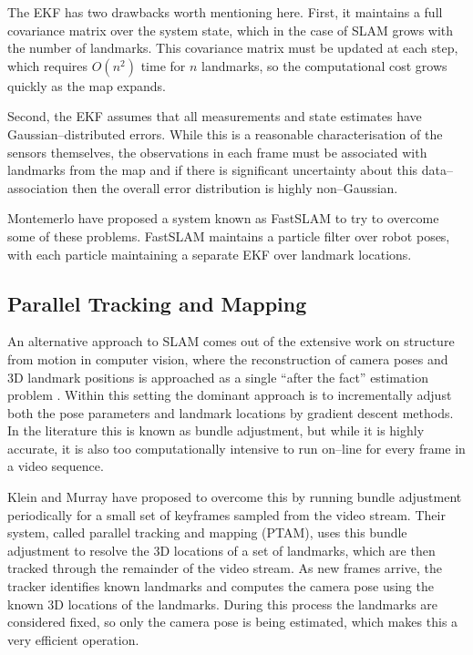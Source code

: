 The EKF has two drawbacks worth mentioning here. First, it maintains a
full covariance matrix over the system state, which in the case of
SLAM grows with the number of landmarks. This covariance matrix must
be updated at each step, which requires $O(n^2)$ time for $n$
landmarks, so the computational cost grows quickly as the map expands.

Second, the EKF assumes that all measurements and state estimates have
Gaussian--distributed errors. While this is a reasonable
characterisation of the sensors themselves, the observations in each
frame must be associated with landmarks from the map and if there is
significant uncertainty about this data--association then the overall
error distribution is highly non--Gaussian.

Montemerlo \etal \cite{Montemerlo02} have proposed a system known as
FastSLAM to try to overcome some of these problems. FastSLAM maintains
a particle filter over robot poses, with each particle maintaining a
separate EKF over landmark locations.

\subsection{Parallel Tracking and Mapping}
An alternative approach to SLAM comes out of the extensive work on
structure from motion in computer vision, where the reconstruction of
camera poses and 3D landmark positions is approached as a single
``after the fact'' estimation problem \cite{Hartley04}. Within this
setting the dominant approach is to incrementally adjust both the pose
parameters and landmark locations by gradient descent methods. In the
literature this is known as bundle adjustment, but while it is highly
accurate, it is also too computationally intensive to run on--line for
every frame in a video sequence.

Klein and Murray \cite{Klein07} have proposed to overcome this by
running bundle adjustment periodically for a small set of keyframes
sampled from the video stream. Their system, called parallel tracking
and mapping (PTAM), uses this bundle adjustment to resolve the 3D
locations of a set of landmarks, which are then tracked through the
remainder of the video stream. As new frames arrive, the tracker
identifies known landmarks and computes the camera pose using the
known 3D locations of the landmarks. During this process the landmarks
are considered fixed, so only the camera pose is being estimated,
which makes this a very efficient operation.

